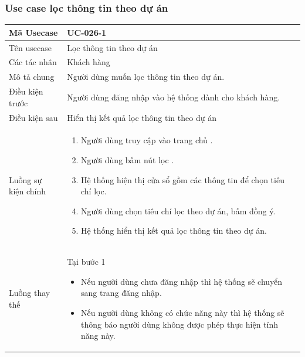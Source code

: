 \documentclass[12pt,a4paper]{article}
\begin{document}

    \subsubsection*{Use case lọc thông tin theo dự án}
    \begin{table}[H]
        \centering
        \begin{tabular}{|p{3.5cm}|p{11.5cm}|c|}
            \hline
            Mã Usecase      & UC-026-1                                               \\
            \hline
            Tên usecase     & Lọc thông tin theo dự án                               \\
            \hline
            Các tác nhân    & Khách hàng                                             \\
            \hline
            Mô tả chung     & Người dùng muốn lọc thông tin theo dự án.              \\
            \hline

            Điều kiện trước & Người dùng đăng nhập vào hệ thống dành cho khách hàng. \\
            \hline

            Điều kiện sau   & Hiển thị kết quả lọc thông tin theo dự án              \\
            \hline

            Luồng sự kiện chính & \vspace{-.8cm}\begin{enumerate}
                                                    \item Người dùng truy cập vào trang chủ .
                                                    \item Người dùng bấm nút lọc .
                                                    \item Hệ thống hiện thị cửa sổ gồm các thông tin để chọn tiêu chí lọc.
                                                    \item Người dùng chọn tiêu chí lọc theo dự án, bấm đồng ý.
                                                    \item Hệ thống hiển thị kết quả lọc thông tin theo dự án.
            \end{enumerate}
            \\
            \hline
            Luồng thay thế & Tại bước 1\newline
            \vspace{-.8cm}\begin{itemize}
                              \item Nếu người dùng chưa đăng nhập thì hệ thống sẽ chuyển sang trang đăng nhập.
                              \item Nếu người dùng không có chức năng này thì hệ thống sẽ thông báo người dùng không được phép thực hiện tính năng này.
            \end{itemize}


\end{tabular}
\end{table}
\end{document}
